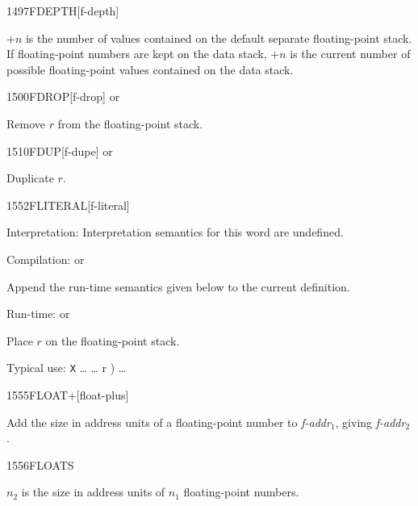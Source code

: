 \begin{newword}{1497}{FDEPTH}[f-depth]

	$+n$ is the number of values contained on the default separate
	floating-point stack. If floating-point numbers are kept on the
	data stack, $+n$ is the current number of possible floating-point
	values contained on the data stack.
\end{newword}


\begin{newword}{1500}{FDROP}[f-drop]
	 or

	Remove $r$ from the floating-point stack.
\end{newword}


\begin{newword}{1510}{FDUP}[f-dupe]
	 or

	Duplicate $r$.
\end{newword}


\begin{newword*}{1552}{FLITERAL}[f-literal]
\item[Interpretation:]
	Interpretation semantics for this word are undefined.

\item[Compilation:]
	 or

	Append the run-time semantics given below to the current
	definition.

\item[Run-time:]
	 or

	Place $r$ on the floating-point stack.

	\begin{rationale} %
		Typical use:
			\word[core]{:} \texttt{X} {\ldots}
				\word[core]{[} {\ldots}  r ) \word[core]{]}
				 {\ldots}
			\word[core]{;}
	\end{rationale}
\end{newword*}


\begin{newword}{1555}{FLOAT+}[float-plus]

	Add the size in address units of a floating-point number to
	\emph{f-addr}$_1$, giving \emph{f-addr}$_2$.
\end{newword}


\begin{newword}{1556}{FLOATS}

	$n_2$ is the size in address units of $n_1$ floating-point
	numbers.
\end{newword}


